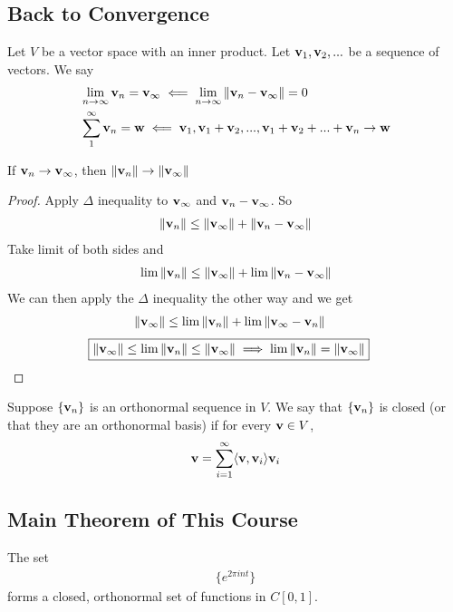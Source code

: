 \subsection{Back to Convergence}
\begin{definition}
    Let $V$ be a vector space with an inner product. Let $\vb{v}_1, \vb{v}_2, ...$ be a sequence of vectors. We say
    \begin{align}
        &\lim_{n\to\infty} \vb{v}_n = \vb{v}_\infty \impliedby \lim_{n\to\infty} \norm{\vb{v}_n - \vb{v}_\infty} = 0\\
        &\sum_1^\infty \vb{v}_n = \vb{w} \impliedby \vb{v}_1, \vb{v}_1 + \vb{v}_2, ..., \vb{v}_1 + \vb{v}_2 + ... + \vb{v}_n \to \vb{w}
    \end{align}
\end{definition}
\begin{lemma}
    If $\vb{v}_n \to \vb{v}_\infty$, then $\norm{\vb{v}_n} \to \norm{\vb{v}_\infty}$
\end{lemma}
\begin{proof}
    Apply $\Delta$ inequality to $\vb{v}_\infty$ and $\vb{v}_n - \vb{v}_\infty$. So
    \begin{align}
        \norm{\vb{v}_n} \le \norm{\vb{v}_\infty} + \norm{\vb{v}_n - \vb{v}_\infty}
    \end{align}
    Take limit of both sides and
    \begin{align}
        \lim \norm{\vb{v}_n} \le \norm{\vb{v}_\infty} + \lim \norm{\vb{v}_n - \vb{v}_\infty}
    \end{align}
    We can then apply the $\Delta$ inequality the other way and we get
    \begin{align}
        &\norm{\vb{v}_\infty} \le  \lim \norm{\vb{v}_n} + \lim \norm{\vb{v}_\infty - \vb{v}_n}
    \end{align}
    \begin{align}
&\boxed{            \norm{\vb{v}_\infty} \le \lim \norm{\vb{v}_n} \le \norm{\vb{v}_\infty}
\implies            \lim \norm{\vb{v}_n} = \norm{\vb{v}_\infty}}
    \end{align}
\end{proof}

\begin{definition}
    Suppose $\{ \vb{v}_n \}$ is an orthonormal sequence in $V$. We say that $\{ \vb{v}_n \}$ is closed (or that they are an orthonormal basis) if for every $\vb{v} \in V$,
    \begin{align}
        \vb{v} = \sum_{i=1}^\infty \langle \vb{v}, \vb{v}_i \rangle \vb{v}_i
    \end{align}
\end{definition}

\subsection{Main Theorem of This Course}
\begin{theorem}
    The set
    \begin{align}
        \{ e^{2\pi int} \}
    \end{align}
    forms a closed, orthonormal set of functions in $C[0,1]$.
\end{theorem}
